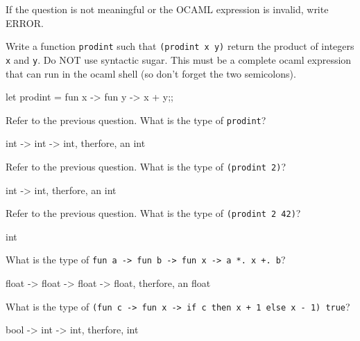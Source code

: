 

\renewcommand\AUTHOR{nweadick1@cougars.ccis.edu} %


\topmattertwo

If the question is not meaningful or the OCAML expression is invalid, write ERROR.

\nextq
Write a function \texttt{prodint} such that \texttt{(prodint x y)} return
the product of integers \verb!x! and \verb!y!.
Do NOT use syntactic sugar.
This must be a complete ocaml expression that can run in the ocaml shell (so
don't forget the two semicolons).
\\
\ANSWER
\begin{answercode}
let prodint = fun x -> fun y -> x + y;;
\end{answercode}

\nextq
Refer to the previous question. 
What is the type of \verb!prodint!?
\\
\ANSWER
\begin{answercode}
int -> int -> int, therfore, an int
\end{answercode}

\nextq
Refer to the previous question. 
What is the type of \verb!(prodint 2)!?
\\
\ANSWER
\begin{answercode}
int -> int, therfore, an int
\end{answercode}

\nextq
Refer to the previous question. 
What is the type of \verb!(prodint 2 42)!?
\\
\ANSWER
\begin{answercode}
int
\end{answercode}

\nextq
What is the type of \verb!fun a -> fun b -> fun x -> a *. x +. b!?
\\
\ANSWER
\begin{answercode}
float -> float -> float -> float, therfore, an float
\end{answercode}

\nextq
What is the type of \verb!(fun c -> fun x -> if c then x + 1 else x - 1) true!?
\\
\ANSWER
\begin{answercode}
bool -> int -> int, therfore, int
\end{answercode}

\newpage




